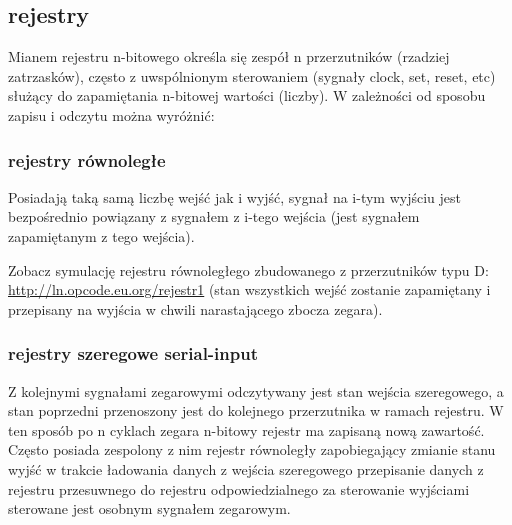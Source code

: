 \documentclass{pdfBooklets}
\begin{document}
\subsection{rejestry}
Mianem rejestru n-bitowego określa się zespół n przerzutników (rzadziej zatrzasków), często z uwspólnionym sterowaniem (sygnały clock, set, reset, etc) służący do zapamiętania n-bitowej wartości (liczby). W zależności od sposobu zapisu i odczytu można wyróżnić:

\subsubsection{rejestry równoległe}
Posiadają taką samą liczbę wejść jak i wyjść, sygnał na i-tym wyjściu jest bezpośrednio powiązany z sygnałem z i-tego wejścia (jest sygnałem zapamiętanym z tego wejścia).

Zobacz symulację rejestru równoległego zbudowanego z przerzutników typu D: \url{http://ln.opcode.eu.org/rejestr1} (stan wszystkich wejść zostanie zapamiętany i przepisany na wyjścia w chwili narastającego zbocza zegara).

\subsubsection{rejestry szeregowe serial-input}
Z kolejnymi sygnałami zegarowymi odczytywany jest stan wejścia szeregowego, a stan poprzedni przenoszony jest do kolejnego przerzutnika w ramach rejestru. W ten sposób po n cyklach zegara n-bitowy rejestr ma zapisaną nową zawartość. Często posiada zespolony z nim rejestr równoległy zapobiegający zmianie stanu wyjść w trakcie ładowania danych z wejścia szeregowego przepisanie danych z rejestru przesuwnego do rejestru odpowiedzialnego za sterowanie wyjściami sterowane jest osobnym sygnałem zegarowym.
\end{document}
